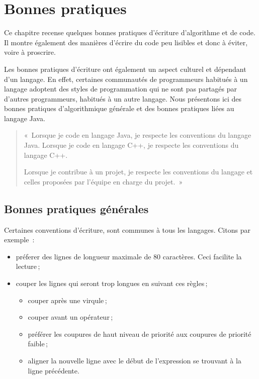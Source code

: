 \chapter{Bonnes pratiques}
\label{bonnespratiques}

	Ce chapitre recense quelques bonnes pratiques d'écriture d'algorithme et de
	code. Il montre également des manières d'écrire du code peu lisibles et donc
	à éviter, voire à proscrire. 
	
	Les bonnes pratiques d'écriture ont également un aspect culturel et
	dépendant d'un langage. En effet, certaines communautés de programmeurs
	habitués à un langage adoptent des styles de programmation qui ne sont pas
	partagés par d'autres programmeurs, habitués à un autre langage. Nous
	présentons ici des bonnes pratiques d'algorithmique générale et des bonnes
	pratiques liées au langage Java. 

	\begin{quote}
		
		{\Large «}~Lorsque je code en langage Java, je respecte les conventions
		du langage Java. 
		Lorsque je code en langage C++, je respecte les
		conventions du langage C++. 

		Lorsque je contribue à un projet, je respecte les conventions du
		langage et celles proposées par l'équipe en charge du projet.~{\Large»}

	\end{quote}

\minitoc


\section{Bonnes pratiques générales}

	Certaines conventions d'écriture, sont communes à tous les langages. Citons
	par exemple~:

	\begin{itemize}

		\item préferer des lignes de longueur maximale de 80 caractères. Ceci
			facilite la lecture\,;
		
		\item couper les lignes qui seront trop longues en suivant ces règles\,;

			\begin{itemize}
				
				\item couper après une virqule\,;
				\item couper avant un opérateur\,;

				\item préférer les coupures de haut niveau de priorité aux
					coupures de priorité faible\,;

				\item aligner la nouvelle ligne avec le début de l'expression
					se trouvant à la ligne précédente.

			\end{itemize}
			
	\end{itemize}

